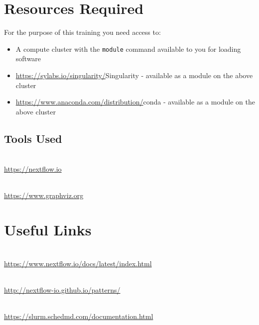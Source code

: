 \section{Resources Required}

For the purpose of this training you need access to:

\begin{itemize}
  \item A compute cluster with the \texttt{module} command available to you for loading software
  \item \url{https://sylabs.io/singularity/}{Singularity} - available as a module on the above cluster
  \item \url{https://www.anaconda.com/distribution/}{conda} - available as a module on the above cluster
\end{itemize}


\subsection{Tools Used}
\begin{description}[style=multiline,labelindent=0cm,align=left,leftmargin=0.5cm]
  \item[Nextflow]\hfill\\
    \url{https://nextflow.io}
  \item[Graphviz]\hfill\\
    \url{https://www.graphviz.org}
\end{description}

\section{Useful Links}

\begin{description}[style=multiline,labelindent=0cm,align=left,leftmargin=0.5cm]
  \item[Nextflow Documentation]\hfill\\
    \url{https://www.nextflow.io/docs/latest/index.html}
  \item[Nextflow Patterns]\hfill\\
    \url{http://nextflow-io.github.io/patterns/}
  \item[Slurm Documentation]\hfill\\
    \url{https://slurm.schedmd.com/documentation.html}

\end{description}

